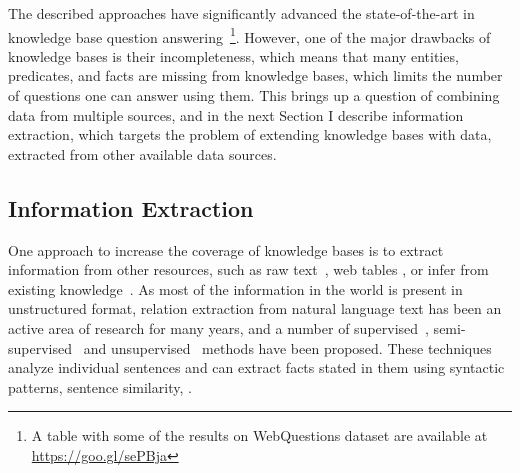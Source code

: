 The described approaches have significantly advanced the state-of-the-art in knowledge base question answering~\footnote{A table with some of the results on WebQuestions dataset are available at \href{url}{https://goo.gl/sePBja}}.
However, one of the major drawbacks of knowledge bases is their incompleteness, which means that many entities, predicates, and facts are missing from knowledge bases, which limits the number of questions one can answer using them.
This brings up a question of combining data from multiple sources, and in the next Section I describe information extraction, which targets the problem of extending knowledge bases with data, extracted from other available data sources.

\subsection{Information Extraction}
\label{section:relatedwork:factoid:relextract}


One approach to increase the coverage of knowledge bases is to extract information from other resources, such as raw text~\cite{Gupta:2014:BOS:2732286.2732288,jijkoun2004information,MintzBSJ09}, web tables \cite{Cafarella:2008:WEP:1453856.1453916}, or infer from existing knowledge~\cite{bordes2011learning,gardner2015efficient,lao2012reading}.
As most of the information in the world is present in unstructured format, relation extraction from natural language text has been an active area of research for many years, and a number of supervised~\cite{snow2004learning}, semi-supervised~\cite{Agichtein:2000:SER:336597.336644} and unsupervised~\cite{Fader:2011:IRO:2145432.2145596} methods have been proposed.
These techniques analyze individual sentences and can extract facts stated in them using syntactic patterns, sentence similarity, \etc.

